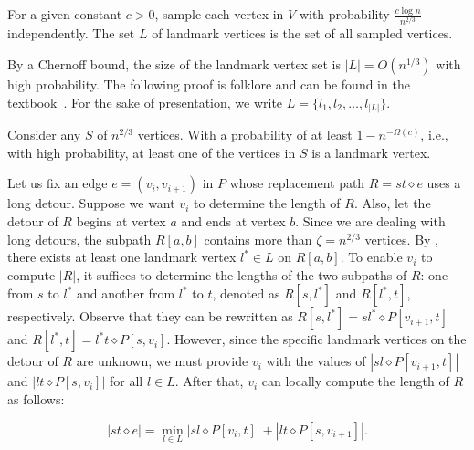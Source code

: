 \begin{definition}
For a given constant $c  > 0$, sample each vertex in $V$ with probability $\frac{c \log n}{n^{2/3}}$ independently.
 The set $L$ of landmark vertices is the set of all sampled vertices.
\end{definition}

By a Chernoff bound, the size of the landmark vertex set is $|L| 
 = \widetilde{O}(n^{1/3})$ with high probability. The following proof is folklore and can be found in the textbook~\cite{greene1990mathematics}. For the sake of presentation, we write $L=\{l_1,l_2, \ldots, l_{|L|}\}$.

\begin{lemma}
\label{Lem : Landmark Vertex}
    Consider any $S$ of $n^{2/3}$ vertices. With a probability of at least $1- n^{-\Omega(c)}$, i.e., with high probability, at least one of the vertices in $S$ is a landmark vertex.
\end{lemma}

Let us fix an edge $e = (v_i, v_{i+1})$ in $P$ whose replacement path $R = st \diamond e$ uses a long detour. Suppose we want $v_i$ to determine the length of $R$. Also, let the detour of $R$ begins at vertex $a$ and ends at vertex $b$. Since we are dealing with long detours, the subpath $R[a,b]$ contains more than $\zeta = n^{2/3}$ vertices. By , there exists at least one landmark vertex $l^* \in L$ on $R[a,b]$. To enable $v_i$ to compute $|R|$, it suffices to determine the lengths of the two subpaths of $R$: one from $s$ to $l^*$ and another from $l^*$ to $t$, denoted as $R[s, l^*]$ and $R[l^*, t]$, respectively. Observe that they can be rewritten as $
R[s, l^*] = sl^* \diamond P[v_{i+1}, t]$ and $R[l^*, t] = l^*t \diamond P[s, v_i]$. However, since the specific landmark vertices on the detour of $R$ are unknown, we must provide $v_i$ with the values of $|s l \diamond P[v_{i+1}, t]|$ and $|l t \diamond P[s, v_i]|$ for all $l \in L$. After that, $v_i$ can locally compute the length of $R$ as follows:

$$|st \diamond e| =\min\limits_{l \in L} |s l \diamond P[v_i,t]| + |lt \diamond P[s,v_{i+1}]|.$$




